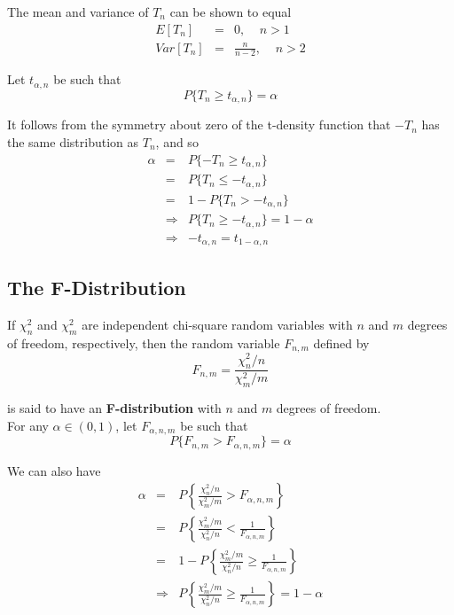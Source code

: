 \documentclass[12pt]{article}
\begin{document}
The mean and variance of $T_n$ can be shown to equal
\begin{eqnarray*}
  E[T_n] &=& 0, \;\;\;\; n > 1 \\
  Var[T_n] &=& \frac{n}{n-2}, \;\;\;\; n > 2
\end{eqnarray*}

Let $t_{\alpha, n}$ be such that
\begin{equation*}
  P\{ T_n \ge t_{\alpha, n} \} = \alpha
\end{equation*}

It follows from the symmetry about zero of the t-density function that $-T_n$ has the same distribution as $T_n$, and so
\begin{eqnarray*}
  \alpha
  &=& P \{ -T_n \ge t_{\alpha, n} \} \\
  &=& P \{ T_n \le -t_{\alpha, n} \} \\
  &=& 1 - P \{ T_n > -t_{\alpha, n} \} \\
  &\Rightarrow& P\{ T_n \ge -t_{\alpha, n} \} = 1 - \alpha \\
  &\Rightarrow& -t_{\alpha, n} = t_{1-\alpha, n}
\end{eqnarray*}

\subsection{The F-Distribution}

If $\chi_n^2$ and $\chi_m^2$ are independent chi-square random variables with $n$ and $m$ degrees of freedom, respectively, then the random variable $F_{n,m}$ defined by
\begin{equation*}
  F_{n,m} = \frac{\chi_n^2/n}{\chi_m^2/m}
\end{equation*}

is said to have an \textbf{F-distribution} with $n$ and $m$ degrees of freedom. \\

For any $\alpha \in (0,1)$, let $F_{\alpha, n, m}$ be such that
\begin{equation*}
  P \{ F_{n,m} > F_{\alpha, n, m} \} = \alpha
\end{equation*}

We can also have
\begin{eqnarray*}
  \alpha
  &=& P \left\{ \frac{\chi_n^2/n}{\chi_m^2/m} > F_{\alpha, n, m} \right\} \\
  &=& P \left\{ \frac{\chi_m^2/m}{\chi_n^2/n}
      < \frac{1}{F_{\alpha, n, m}} \right\} \\
  &=& 1 - P \left\{ \frac{\chi_m^2/m}{\chi_n^2/n}
      \ge \frac{1}{F_{\alpha, n, m}} \right\} \\
  &\Rightarrow& P \left\{ \frac{\chi_m^2/m}{\chi_n^2/n}
      \ge \frac{1}{F_{\alpha, n, m}} \right\} = 1 - \alpha
\end{eqnarray*}
\end{document}
